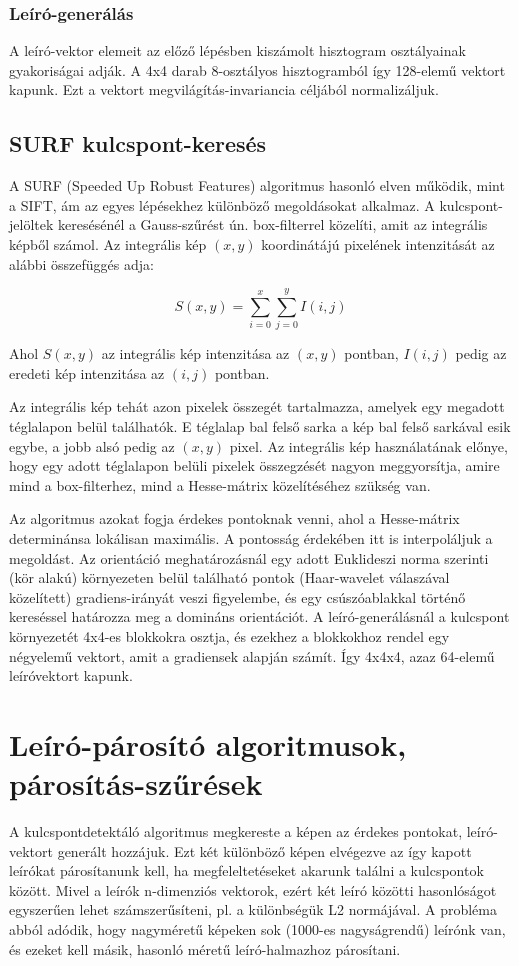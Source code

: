 	\subsubsection{Leíró-generálás}
	A leíró-vektor elemeit az előző lépésben kiszámolt hisztogram osztályainak gyakoriságai adják. A 4x4 darab 8-osztályos hisztogramból így 128-elemű vektort kapunk. Ezt a vektort megvilágítás-invariancia céljából normalizáljuk.
	
	\subsection{SURF kulcspont-keresés}
	A SURF (Speeded Up Robust Features) \cite{HerbertSURF} algoritmus hasonló elven működik, mint a SIFT, ám az egyes lépésekhez különböző megoldásokat alkalmaz. A kulcspont-jelöltek keresésénél a Gauss-szűrést ún. box-filterrel közelíti, amit az integrális képből számol. Az integrális kép $(x,y)$ koordinátájú pixelének intenzitását az alábbi összefüggés adja:
	
\begin{equation}
S(x, y) = \sum_{i=0}^x \sum_{j=0}^y I(i, j)
\end{equation}

Ahol $S(x, y)$ az integrális kép intenzitása az $(x, y)$ pontban, $I(i, j)$ pedig az eredeti kép intenzitása az $(i, j)$ pontban.
	
	Az integrális kép tehát azon pixelek összegét tartalmazza, amelyek egy megadott téglalapon belül találhatók. E téglalap bal felső sarka a kép bal felső sarkával esik egybe, a jobb alsó pedig az $(x,y)$ pixel. Az integrális kép használatának előnye, hogy egy adott téglalapon belüli pixelek összegzését nagyon meggyorsítja, amire mind a box-filterhez, mind a Hesse-mátrix közelítéséhez szükség van.
	
	Az algoritmus azokat fogja érdekes pontoknak venni, ahol a Hesse-mátrix determinánsa lokálisan maximális. A pontosság érdekében itt is interpoláljuk a megoldást. Az orientáció meghatározásnál egy adott Euklideszi norma szerinti (kör alakú) környezeten belül található pontok (Haar-wavelet válaszával közelített) gradiens-irányát veszi figyelembe, és egy csúszóablakkal történő kereséssel határozza meg a domináns orientációt. A leíró-generálásnál a kulcspont környezetét 4x4-es blokkokra osztja, és ezekhez a blokkokhoz rendel egy négyelemű vektort, amit a gradiensek alapján számít. Így 4x4x4, azaz 64-elemű leíróvektort kapunk.
	
	\section{Leíró-párosító algoritmusok, párosítás-szűrések}
	\label{matching}
	A kulcspontdetektáló algoritmus megkereste a képen az érdekes pontokat, leíró-vektort generált hozzájuk. Ezt két különböző képen elvégezve az így kapott leírókat párosítanunk kell, ha megfeleltetéseket akarunk találni a kulcspontok között. Mivel a leírók n-dimenziós vektorok, ezért két leíró közötti hasonlóságot egyszerűen lehet számszerűsíteni, pl. a különbségük L2 normájával. A probléma abból adódik, hogy nagyméretű képeken sok (1000-es nagyságrendű) leírónk van, és ezeket kell másik, hasonló méretű leíró-halmazhoz párosítani.
	
